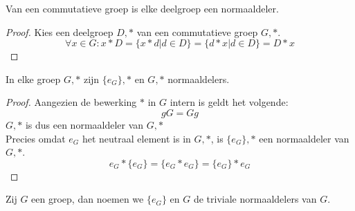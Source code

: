 \documentclass[main.tex]{subfiles}
\begin{document}
\begin{st}
  Van een commutatieve groep is elke deelgroep een normaaldeler.

  \begin{proof}
    Kies een deelgroep $D,*$ van een commutatieve groep $G,*$.
    \[ \forall x\in G: x*D = \{ x*d | d \in D \} = \{ d*x | d \in D \} = D*x \]
  \end{proof}
\end{st}

\begin{st}
  In elke groep $G,*$ zijn $\{e_{G}\},*$ en $G,*$ normaaldelers.
  
  \begin{proof}
    Aangezien de bewerking $*$ in $G$ intern is geldt het volgende:
    \[ gG = Gg \]
    $G,*$ is dus een normaaldeler van $G,*$\\
    Precies omdat $e_{G}$ het neutraal element is in $G,*$, is $\{e_{G}\},*$ een normaaldeler van $G,*$.
    \[ e_G*\{e_{G}\} = \{e_{G} * e_{G}\} = \{e_{G}\}*e_{G} \]
  \end{proof}
\end{st}

\begin{de}
  Zij $G$ een groep, dan noemen we $\{e_{G}\}$ en $G$ de triviale normaaldelers van $G$.
\end{de}
\end{document}
